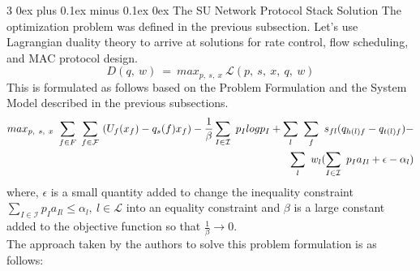 \documentclass[12pt, draftcls, onecolumn]{IEEEtran}
\makeatletter
\def\subsubsection{\@startsection{subsubsection}%
                                 {3}%
                                 {\z@}%
                                 {0ex plus 0.1ex minus 0.1ex}%
                                 {0ex}%
                                 {\normalfont\normalsize\bfseries}}%
\makeatother
\begin{document}
\subsubsection{The SU Network Protocol Stack Solution}
The optimization problem was defined in the previous subsection. Let's use Lagrangian duality theory to arrive at solutions for rate control, flow scheduling, and MAC protocol design.
\[D(q,\ w)\ =\ max_{p,\ s,\ x}\ \mathcal{L}(p,\ s,\ x,\ q,\ w)\]
This is formulated as follows based on the Problem Formulation and the  System Model described in the previous subsections.
\begin{equation}
    \begin{aligned}
        max_{p,\ s,\ x}\ \sum_{f \in \mathcal\mathcal{F}}\ \sum_{f \in \mathcal{F}}\ (U_f(x_f) - q_s(f)x_f) - \frac{1}{\beta}\sum_{I \in \mathcal{I}}\ p_I log p_I + \sum_{l}\ \sum_{f}\ s_{fl}(q_{h(l)f} - q_{t(l)f}) - \\\sum_{l}\ w_l(\sum_{I \in \mathcal{I}}\ p_I a_{Il} + \epsilon - \alpha_l)
    \end{aligned}
\end{equation}
where, $\epsilon$ is a small quantity added to change the inequality constraint $\sum_{I \in \mathcal{I}} p_I a_{Il} \leq \alpha_l,\ l \in \mathcal{L}$ into an equality constraint and $\beta$ is a large constant added to the objective function so that $\frac{1}{\beta} \rightarrow 0$.
\\The approach taken by the authors to solve this problem formulation is as follows:
\end{document}
